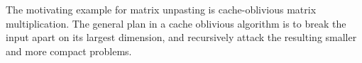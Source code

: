 The motivating example for matrix unpasting is cache-oblivious
matrix multiplication.  The general plan in a cache oblivious
algorithm is to break the input apart on its largest dimension,
and recursively attack the resulting smaller and more compact
problems.

